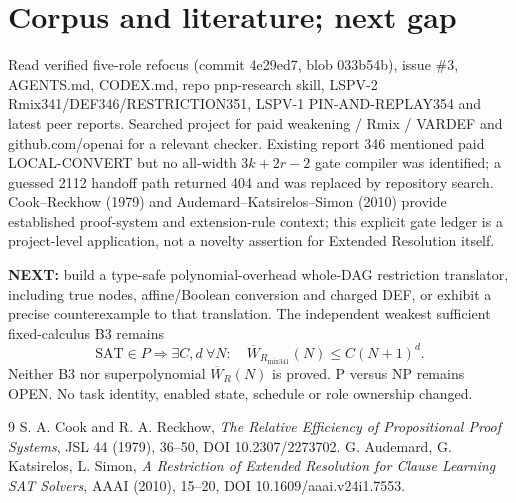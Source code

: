 \documentclass[11pt]{article}
\begin{document}
\section*{Corpus and literature; next gap}
Read verified five-role refocus (commit 4e29ed7, blob 033b54b), issue \#3, AGENTS.md, CODEX.md, repo pnp-research skill, LSPV-2 Rmix341/DEF346/RESTRICTION351, LSPV-1 PIN-AND-REPLAY354 and latest peer reports. Searched project for paid weakening / Rmix / VARDEF and github.com/openai for a relevant checker. Existing report 346 mentioned paid LOCAL-CONVERT but no all-width $3k+2r-2$ gate compiler was identified; a guessed 2112 handoff path returned 404 and was replaced by repository search. Cook--Reckhow (1979) and Audemard--Katsirelos--Simon (2010) provide established proof-system and extension-rule context; this explicit gate ledger is a project-level application, not a novelty assertion for Extended Resolution itself.

\textbf{NEXT:} build a type-safe polynomial-overhead whole-DAG restriction translator, including true nodes, affine/Boolean conversion and charged DEF, or exhibit a precise counterexample to that translation. The independent weakest sufficient fixed-calculus B3 remains
\[
\mathrm{SAT}\in P\Longrightarrow \exists C,d\ \forall N:\quad \overline W_{R_{\mathrm{mix341}}}(N)\le C(N+1)^d.
\]
Neither B3 nor superpolynomial $\overline W_R(N)$ is proved. P versus NP remains OPEN. No task identity, enabled state, schedule or role ownership changed.

\begin{thebibliography}{9}
 S. A. Cook and R. A. Reckhow, \emph{The Relative Efficiency of Propositional Proof Systems}, JSL 44 (1979), 36--50, DOI 10.2307/2273702.
 G. Audemard, G. Katsirelos, L. Simon, \emph{A Restriction of Extended Resolution for Clause Learning SAT Solvers}, AAAI (2010), 15--20, DOI 10.1609/aaai.v24i1.7553.
\end{thebibliography}
\end{document}
